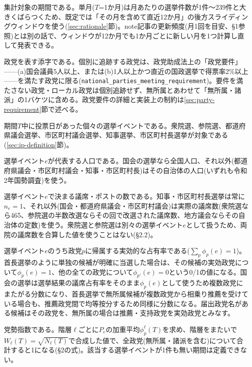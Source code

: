 \documentclass[a4paper,11pt]{ltjsarticle}
\begin{document}
\begin{description}[leftmargin=2.2cm,style=nextline]
  \item[$T$] 集計対象の期間である。単月($T$=1か月)は月あたりの選挙件数が1件〜239件と大きくばらつくため、既定では「その月を含めて直近12か月」の後方スライディングウィンドウを使う(\ref{sec:rationale}節)。note記事の更新頻度(月1回を目安、\S1参照)とは別の話で、ウィンドウが12か月でも1か月ごとに新しい月を1つ計算し直して発表できる。

  \item[$p$] 政党を表す添字である。個別に追跡する政党は、政党助成法上の「政党要件」——(a)国会議員5人以上、または(b)1人以上かつ直近の国政選挙で得票率2\%以上——を満たす政党に限る(\texttt{national\_parties\_meeting\_requirement})。要件を満たさない政党・ローカル政党は個別追跡せず、無所属とあわせて「無所属・諸派」の1バケツに含める。政党要件の詳細と実装上の制約は\ref{sec:party-requirement}節で述べる。

  \item[$e$] 期間$T$中に投票日があった個々の選挙イベントである。衆院選、参院選、都道府県議会選挙、市区町村議会選挙、知事選挙、市区町村長選挙が対象である(\ref{sec:ip-definition}節)。

  \item[$P_e$] 選挙イベント$e$が代表する人口である。国会の選挙なら全国人口、それ以外(都道府県議会・市区町村議会・知事・市区町村長)はその自治体の人口(いずれも令和2年国勢調査)を使う。

  \item[$n_e$] 選挙イベント$e$で決まる議席・ポストの数である。知事・市区町村長選挙は常に$n_e=1$、それ以外(国会・都道府県議会・市区町村議会)は実際の議席数(衆院選なら465、参院選の半数改選ならその回で改選された議席数、地方議会ならその自治体の定数)を使う。衆院選と参院選は別々の選挙イベント$e$として扱うため、両院の議席数を合算した値を使うことはない(\S2.2)。

  \item[$\phi_p(e)$] 選挙イベント$e$のうち政党$p$に帰属する実効的な占有率である($\sum_p \phi_p(e) = 1$)。首長選挙のように単独の候補が明確に当選した場合は、その候補の実効政党について$\phi_p(e)=1$、他の全ての政党について$\phi_{p'}(e)=0$という0/1の値になる。国会の選挙は選挙結果の議席占有率をそのまま$\phi_p(e)$として使うため複数政党にまたがる分数になり、首長選挙で無所属候補が複数政党から相乗り推薦を受けている場合も、推薦政党間で均等按分するため同様に分数になる。届出政党名がある候補はその政党を、無所属の場合は推薦・支持政党を実効政党とみなす。

  \item[$C_p(T)$] 党勢指数である。階層$\ell$ごとに$P_e$の加重平均$\phi_p^\ell(T)$を求め、階層をまたいで$W_\ell(T)=\sqrt{N_\ell(T)}$で合成した値で、全政党(無所属・諸派を含む)について合計すると1になる(\S2の式)。該当する選挙イベントが1件も無い期間は定義できない。
\end{description}
\end{document}
